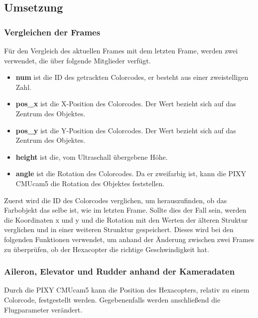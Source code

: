   \subsection{Umsetzung}

    \subsubsection{Vergleichen der Frames}
    Für den Vergleich des aktuellen Frames mit dem letzten Frame, werden zwei  verwendet, die über folgende Mitglieder verfügt. \cite{Structs}
    \begin{itemize}
      \item \textbf{num} ist die ID des getrackten Colorcodes, er besteht aus einer zweistelligen Zahl.
      \item \textbf{pos\_x} ist die X-Position des Colorcodes. Der Wert bezieht sich auf das Zentrum des Objektes.
      \item \textbf{pos\_y} ist die Y-Position des Colorcodes. Der Wert bezieht sich auf das Zentrum des Objektes.
      \item \textbf{height} ist die, vom Ultraschall übergebene Höhe.
      \item \textbf{angle} ist die Rotation des Colorcodes. Da er zweifarbig ist, kann die PIXY CMUcam5 die Rotation des Objektes feststellen.
    \end{itemize}

    Zuerst wird die ID des Colorcodes verglichen, um herauszufinden, ob das Farbobjekt das selbe ist, wie im letzten Frame.
    Sollte dies der Fall sein, werden die Koordinaten x und y und die Rotation mit den Werten der älteren Struktur verglichen und in einer weiteren Strunktur gespeichert. Dieses wird bei den folgenden Funktionen verwendet, um anhand der Änderung zwischen zwei Frames zu überprüfen, ob der Hexacopter die richtige Geschwindigkeit hat.

    \subsubsection{Aileron, Elevator und Rudder anhand der Kameradaten}
    Durch die PIXY CMUcam5 kann die Position des Hexacopters, relativ zu einem Colorcode, festgestellt werden. Gegebenenfalls werden anschließend die Flugparameter verändert.

